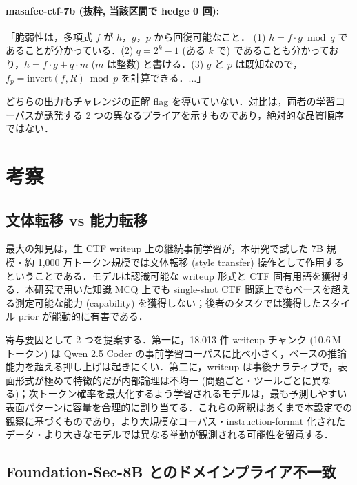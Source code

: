 \documentclass[10pt,twocolumn,a4paper]{ltjsarticle}
\begin{document}
\paragraph{masafee-ctf-7b (抜粋, 当該区間で hedge 0 回):}
「脆弱性は，多項式 $f$ が $h$，$g$，$p$ から回復可能なこと． (1) $h = f \cdot g \bmod q$ であることが分かっている．(2) $q = 2^k - 1$ (ある $k$ で) であることも分かっており，$h = f \cdot g + q \cdot m$ ($m$ は整数) と書ける．(3) $g$ と $p$ は既知なので，$f_p = \mathrm{invert}(f, R) \bmod p$ を計算できる．...」

どちらの出力もチャレンジの正解 flag を導いていない．対比は，両者の学習コーパスが誘発する 2 つの異なるプライアを示すものであり，絶対的な品質順序ではない．

\section{考察}

\subsection{文体転移 vs 能力転移}

最大の知見は，生 CTF writeup 上の継続事前学習が，本研究で試した 7B 規模・約 1{,}000 万トークン規模では文体転移 (style transfer) 操作として作用するということである．モデルは認識可能な writeup 形式と CTF 固有用語を獲得する．本研究で用いた知識 MCQ 上でも single-shot CTF 問題上でもベースを超える測定可能な能力 (capability) を獲得しない；後者のタスクでは獲得したスタイル prior が能動的に有害である．

寄与要因として 2 つを提案する．第一に，18{,}013 件 writeup チャンク (10.6\,M トークン) は Qwen 2.5 Coder の事前学習コーパスに比べ小さく，ベースの推論能力を超える押し上げは起きにくい．第二に，writeup は事後ナラティブで，表面形式が極めて特徴的だが内部論理は不均一 (問題ごと・ツールごとに異なる)；次トークン確率を最大化するよう学習されるモデルは，最も予測しやすい表面パターンに容量を合理的に割り当てる．これらの解釈はあくまで本設定での観察に基づくものであり，より大規模なコーパス・instruction-format 化されたデータ・より大きなモデルでは異なる挙動が観測される可能性を留意する．

\subsection{Foundation-Sec-8B とのドメインプライア不一致}
\end{document}
